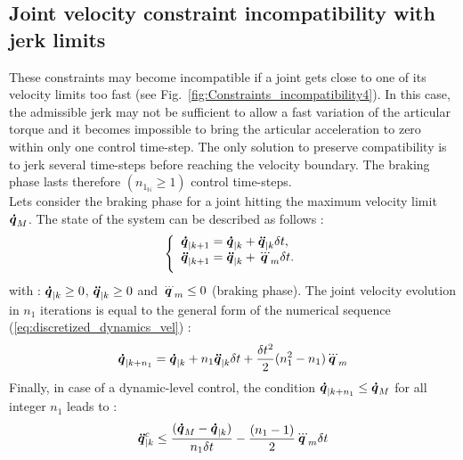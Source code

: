 \documentclass[a4paper, 10pt, conference]{ieeeconf}      %
\newcommand{\vect}[1]{\mbox{\boldmath${#1}$}}%
\begin{document}
\subsection{Joint velocity constraint incompatibility with jerk limits}
These constraints may become incompatible if a joint gets close to one of its velocity limits too fast (see Fig.~\ref{fig:Constraints_incompatibility4}). In this case, the admissible jerk may not be sufficient to allow a fast variation of the articular torque and it becomes impossible to bring the articular acceleration to zero within only one control time-step. The only solution to preserve compatibility is to jerk several time-steps before reaching the velocity boundary. The braking phase lasts therefore $(n_{1_{\mathbb{N}}} \geq 1)$ control time-steps. 
\\
Lets consider the braking phase for a joint hitting the maximum velocity limit $\vect{\dot{q}}_{M}$. The state of the system can be described as follows :
\begin{equation} 
\left\{\begin{array}{lcl}
\vect{\dot{q}}_{|k+1} = \vect{\dot{q}}_{|k} + \vect{\ddot{q}}_{|k} \delta t, \\
\vspace{2mm}
\vect{\ddot{q}}_{|k+1} = \vect{\ddot{q}}_{|k} + \vect{\dddot{q}}_{m} \delta t.
\end{array}\right.
\label{eq:discretized_dynamics_vel}
\end{equation}
with : $\vect{\dot{q}}_{|k} \geq 0$, $\vect{\ddot{q}}_{|k} \geq 0$ and  $\vect{\dddot{q}}_{m} \leq 0$ (braking phase). The joint velocity evolution in $n_1$ iterations is equal to the general form of the numerical sequence (\ref{eq:discretized_dynamics_vel}) :
\begin{equation}
\begin{split}
\vect{\dot{q}}_{|k+n_1} = \vect{\dot{q}}_{|k} + n_1 \vect{\ddot{q}}_{|k} \delta t + \frac{\delta t^2}{2} (n_1^2-n_1) \vect{\dddot{q}}_{m} 
\label{eq:q_dot_evolution_with_const_qdddot_m}
\end{split}
\end{equation}
Finally, in case of a dynamic-level control, the condition $\vect{\dot{q}}_{|k+n_1} \leq \vect{\dot{q}}_{M}$ for all integer $n_1$ leads to :
\begin{equation}
\begin{split}
\vect{\ddot{q}}_{|k}^{c} \leq \frac{(\vect{\dot{q}}_M-\vect{\dot{q}}_{|k})}{n_1 \delta t} - \frac{(n_1-1)}{2} \vect{\dddot{q}}_m \delta t 
\label{eq:q_ddot_vel_jerk_comp_aa_n1}
\end{split}
\end{equation}
\end{document}
